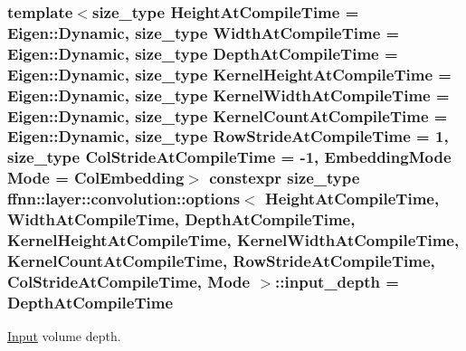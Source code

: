 \hypertarget{structffnn_1_1layer_1_1convolution_1_1options_a5c928d8733be98927ccd22d009739deb}{
\subsubsection[{input\-\_\-depth}]{\setlength{\rightskip}{0pt plus 5cm}template$<$size\-\_\-type Height\-At\-Compile\-Time = Eigen\-::\-Dynamic, size\-\_\-type Width\-At\-Compile\-Time = Eigen\-::\-Dynamic, size\-\_\-type Depth\-At\-Compile\-Time = Eigen\-::\-Dynamic, size\-\_\-type Kernel\-Height\-At\-Compile\-Time = Eigen\-::\-Dynamic, size\-\_\-type Kernel\-Width\-At\-Compile\-Time = Eigen\-::\-Dynamic, size\-\_\-type Kernel\-Count\-At\-Compile\-Time = Eigen\-::\-Dynamic, size\-\_\-type Row\-Stride\-At\-Compile\-Time = 1, size\-\_\-type Col\-Stride\-At\-Compile\-Time = -\/1, Embedding\-Mode Mode = Col\-Embedding$>$ constexpr {\bf size\-\_\-type} {\bf ffnn\-::layer\-::convolution\-::options}$<$ Height\-At\-Compile\-Time, Width\-At\-Compile\-Time, Depth\-At\-Compile\-Time, Kernel\-Height\-At\-Compile\-Time, Kernel\-Width\-At\-Compile\-Time, Kernel\-Count\-At\-Compile\-Time, Row\-Stride\-At\-Compile\-Time, Col\-Stride\-At\-Compile\-Time, Mode $>$\-::input\-\_\-depth = Depth\-At\-Compile\-Time\hspace{0.3cm}{\ttfamily [static]}}}\label{structffnn_1_1layer_1_1convolution_1_1options_a5c928d8733be98927ccd22d009739deb}


\hyperlink{classffnn_1_1layer_1_1_input}{Input} volume depth. 

